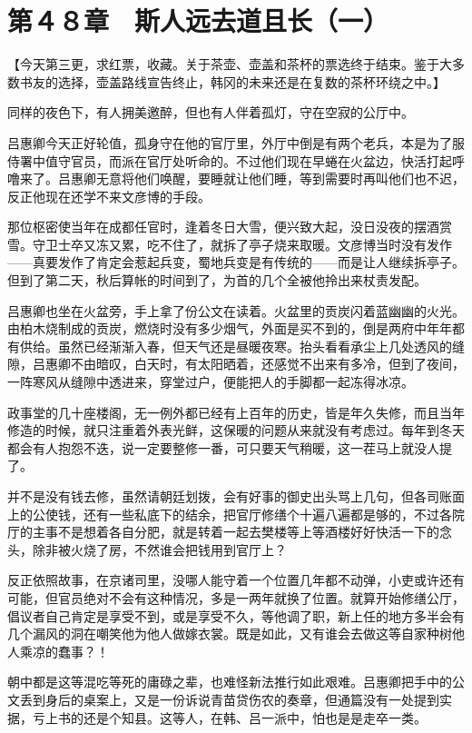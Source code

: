 \section{第４８章　斯人远去道且长（一）}

【今天第三更，求红票，收藏。关于茶壶、壶盖和茶杯的票选终于结束。鉴于大多数书友的选择，壶盖路线宣告终止，韩冈的未来还是在复数的茶杯环绕之中。】

同样的夜色下，有人拥美邀醉，但也有人伴着孤灯，守在空寂的公厅中。

吕惠卿今天正好轮值，孤身守在他的官厅里，外厅中倒是有两个老兵，本是为了服侍署中值守官员，而派在官厅处听命的。不过他们现在早蜷在火盆边，快活打起呼噜来了。吕惠卿无意将他们唤醒，要睡就让他们睡，等到需要时再叫他们也不迟，反正他现在还学不来文彦博的手段。

那位枢密使当年在成都任官时，逢着冬日大雪，便兴致大起，没日没夜的摆酒赏雪。守卫士卒又冻又累，吃不住了，就拆了亭子烧来取暖。文彦博当时没有发作——真要发作了肯定会惹起兵变，蜀地兵变是有传统的——而是让人继续拆亭子。但到了第二天，秋后算帐的时间到了，为首的几个全被他拎出来杖责发配。

吕惠卿也坐在火盆旁，手上拿了份公文在读着。火盆里的贡炭闪着蓝幽幽的火光。由柏木烧制成的贡炭，燃烧时没有多少烟气，外面是买不到的，倒是两府中年年都有供给。虽然已经渐渐入春，但天气还是昼暖夜寒。抬头看看承尘上几处透风的缝隙，吕惠卿不由暗叹，白天时，有太阳晒着，还感觉不出来有多冷，但到了夜间，一阵寒风从缝隙中透进来，穿堂过户，便能把人的手脚都一起冻得冰凉。

政事堂的几十座楼阁，无一例外都已经有上百年的历史，皆是年久失修，而且当年修造的时候，就只注重着外表光鲜，这保暖的问题从来就没有考虑过。每年到冬天都会有人抱怨不迭，说一定要整修一番，可只要天气稍暖，这一茬马上就没人提了。

并不是没有钱去修，虽然请朝廷划拨，会有好事的御史出头骂上几句，但各司账面上的公使钱，还有一些私底下的结余，把官厅修缮个十遍八遍都是够的，不过各院厅的主事不是想着各自分肥，就是转着一起去樊楼等上等酒楼好好快活一下的念头，除非被火烧了房，不然谁会把钱用到官厅上？

反正依照故事，在京诸司里，没哪人能守着一个位置几年都不动弹，小吏或许还有可能，但官员绝对不会有这种情况，多是一两年就换了位置。就算开始修缮公厅，倡议者自己肯定是享受不到，或是享受不久，等他调了职，新上任的地方多半会有几个漏风的洞在嘲笑他为他人做嫁衣裳。既是如此，又有谁会去做这等自家种树他人乘凉的蠢事？！

朝中都是这等混吃等死的庸碌之辈，也难怪新法推行如此艰难。吕惠卿把手中的公文丢到身后的桌案上，又是一份诉说青苗贷伤农的奏章，但通篇没有一处提到实据，亏上书的还是个知县。这等人，在韩、吕一派中，怕也是是走卒一类。

